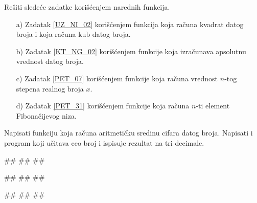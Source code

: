 \begin{Exercise}[label=FUN_OLD_1] 
Rešiti sledeće zadatke korišćenjem narednih funkcija.
\begin{itemize}
 \item [a)] Zadatak \ref{UZ_NI_02} korišćenjem funkcija  koja računa kvadrat datog broja i  koja računa kub datog broja.
 \item [b)] Zadatak \ref{KT_NG_02} korišćenjem funkcije  koja izračunava apsolutnu vrednost datog broja.
 \item [c)] Zadatak \ref{PET_07} korišćenjem funkcije  koja računa vrednost $n$-tog stepena realnog broja $x$.
 \item [d)] Zadatak \ref{PET_31} korišćenjem funkcije  koja računa $n$-ti element Fibonačijevog niza.
\end{itemize}
\end{Exercise}



\begin{Exercise}[label=FUN_10] 
Napisati funkciju  koja
računa aritmetičku sredinu cifara datog broja. Napisati i program koji
učitava ceo broj i ispisuje rezultat na tri decimale.
 
\begin{miditest}
\begin{upotreba}{1}
#\naslovInt#
##
##
\end{upotreba}
\end{miditest}
\begin{miditest}
\begin{upotreba}{2}
#\naslovInt#
##
##
\end{upotreba}
\end{miditest}

\begin{miditest}
\begin{upotreba}{3}
#\naslovInt#
##
##
\end{upotreba}
\end{miditest}

\end{Exercise}
\ifresenja 
\begin{Answer}[ref=FUN_10]
\end{Answer} 
\fi


